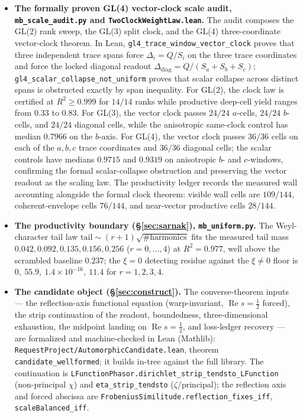 \documentclass[11pt]{article}
\theoremstyle{definition}
\renewcommand{\Re}{\operatorname{Re}}
\begin{document}
\begin{itemize}
\item \textbf{The formally proven GL(4) vector-clock scale audit, \texttt{mb\_scale\_audit.py} and
\texttt{TwoClockWeightLaw.lean}.} The audit composes the GL(2) rank sweep, the GL(3) split clock, and the
GL(4) three-coordinate vector-clock theorem. In Lean,
\texttt{gl4\_trace\_window\_vector\_clock} proves that three independent trace spans force
$\Delta_i=Q/S_i$ on the three trace coordinates and force the locked diagonal readout
$\Delta_{\mathrm{diag}}=Q/(S_a+S_b+S_c)$; \texttt{gl4\_scalar\_collapse\_not\_uniform} proves that scalar
collapse across distinct spans is obstructed exactly by span inequality. For GL(2), the clock law is certified
at $R^2\ge0.999$ for $14/14$ ranks while productive deep-cell yield ranges from $0.33$ to $0.83$. For GL(3),
the vector clock passes $24/24$ $a$-cells, $24/24$ $b$-cells, and $24/24$ diagonal cells, while the anisotropic
same-clock control has median $0.7966$ on the $b$-axis. For GL(4), the vector clock passes $36/36$ cells on
each of the $a,b,c$ trace coordinates and $36/36$ diagonal cells; the scalar controls have medians $0.9715$ and
$0.9319$ on anisotropic $b$- and $c$-windows, confirming the formal scalar-collapse obstruction and preserving
the vector readout as the scaling law. The productivity ledger records the measured wall accounting alongside
the formal clock theorem: visible wall cells are $109/144$, coherent-envelope cells $76/144$, and near-vector
productive cells $28/144$.

\item \textbf{The productivity boundary (\S\ref{sec:sarnak}), \texttt{mb\_uniform.py}.} The
Weyl-character tail law $\text{tail}\sim(r{+}1)\sqrt{\#\text{harmonics}}$ fits the measured tail mass
$0.042,0.092,0.135,0.156,0.256$ ($r=0,\dots,4$) at $R^2=0.977$, well above the scrambled baseline
$0.237$; the $\xi=0$ detecting residue against the $\xi\neq0$ floor is
$0,\ 55.9,\ 1.4\times10^{-16},\ 11.4$ for $r=1,2,3,4$.

\item \textbf{The candidate object (\S\ref{sec:construct}).} The converse-theorem inputs --- the
reflection-axis functional equation (warp-invariant, $\Re s=\tfrac12$ forced), the strip continuation
of the readout, boundedness, three-dimensional exhaustion, the midpoint landing on $\Re s=\tfrac12$,
and loss-ledger recovery --- are formalized and machine-checked in Lean (Mathlib):
\texttt{RequestProject/AutomorphicCandidate.lean}, theorem \texttt{candidate\_wellformed}; it builds in-tree against the full library. The continuation is
\texttt{LFunctionPhasor.dirichlet\_strip\_tendsto\_LFunction} (non-principal $\chi$) and
\texttt{eta\_strip\_tendsto} ($\zeta$/principal); the reflection axis and forced abscissa are
\texttt{FrobeniusSimilitude.reflection\_fixes\_iff}, \texttt{scaleBalanced\_iff}.


\end{itemize}
\end{document}
